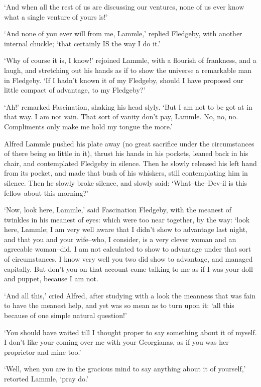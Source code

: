 ‘And when all the rest of us are discussing our ventures, none of us
ever know what a single venture of yours is!’

‘And none of you ever will from me, Lammle,’ replied Fledgeby, with
another internal chuckle; ‘that certainly IS the way I do it.’

‘Why of course it is, I know!’ rejoined Lammle, with a flourish of
frankness, and a laugh, and stretching out his hands as if to show
the universe a remarkable man in Fledgeby. ‘If I hadn’t known it of my
Fledgeby, should I have proposed our little compact of advantage, to my
Fledgeby?’

‘Ah!’ remarked Fascination, shaking his head slyly. ‘But I am not to
be got at in that way. I am not vain. That sort of vanity don’t pay,
Lammle. No, no, no. Compliments only make me hold my tongue the more.’

Alfred Lammle pushed his plate away (no great sacrifice under the
circumstances of there being so little in it), thrust his hands in his
pockets, leaned back in his chair, and contemplated Fledgeby in silence.
Then he slowly released his left hand from its pocket, and made that
bush of his whiskers, still contemplating him in silence. Then he slowly
broke silence, and slowly said: ‘What--the--Dev-il is this fellow about
this morning?’

‘Now, look here, Lammle,’ said Fascination Fledgeby, with the meanest
of twinkles in his meanest of eyes: which were too near together, by
the way: ‘look here, Lammle; I am very well aware that I didn’t show to
advantage last night, and that you and your wife--who, I consider, is
a very clever woman and an agreeable woman--did. I am not calculated to
show to advantage under that sort of circumstances. I know very well you
two did show to advantage, and managed capitally. But don’t you on that
account come talking to me as if I was your doll and puppet, because I
am not.

‘And all this,’ cried Alfred, after studying with a look the meanness
that was fain to have the meanest help, and yet was so mean as to turn
upon it: ‘all this because of one simple natural question!’

‘You should have waited till I thought proper to say something about it
of myself. I don’t like your coming over me with your Georgianas, as if
you was her proprietor and mine too.’

‘Well, when you are in the gracious mind to say anything about it of
yourself,’ retorted Lammle, ‘pray do.’

